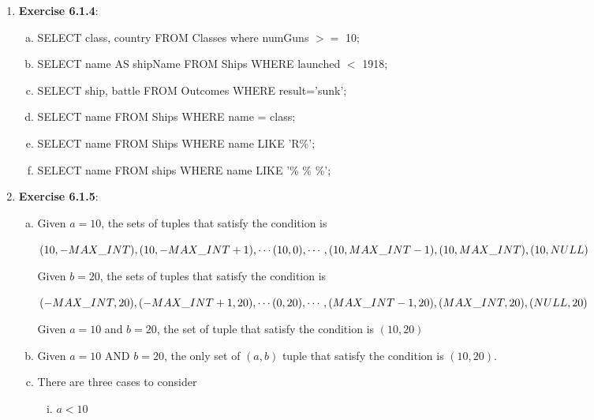 \documentclass[12pt]{article}
\begin{document}
\begin{enumerate}[1.]
    \item \textbf{Exercise 6.1.4}:

    \begin{enumerate}[a)]
        \item SELECT class, country FROM Classes where numGuns $>=$ 10;
        \item SELECT name AS shipName FROM Ships WHERE launched $<$ 1918;
        \item SELECT ship, battle FROM Outcomes WHERE result='sunk';
        \item SELECT name FROM Ships WHERE name = class;
        \item SELECT name FROM Ships WHERE name LIKE 'R\%';
        \item SELECT name FROM ships WHERE name LIKE '\% \% \%';
    \end{enumerate}

    \item \textbf{Exercise 6.1.5}:
    \begin{enumerate}[a)]
        \item Given $a = 10$, the sets of tuples that satisfy the condition is

        \bigskip

        $(10, -MAX\_INT), (10,-MAX\_INT + 1), \cdots (10,0), \cdots, (10,MAX\_INT - 1), \\
        (10,MAX\_INT), (10, NULL)$

        \bigskip

        Given $b = 20$, the sets of tuples that satisfy the condition is

        \bigskip

        $(-MAX\_INT, 20), (-MAX\_INT + 1, 20), \cdots (0, 20), \cdots, (MAX\_INT - 1, 20), \\
        (MAX\_INT, 20), (NULL, 20)$

        \bigskip

        Given $a = 10$ and $b = 20$, the set of tuple that satisfy the condition
        is $(10, 20)$

        \item

        Given $a = 10$ AND $b = 20$, the only set of $(a,b)$ tuple that satisfy the
        condition is $(10, 20)$.

        \item

        There are three cases to consider

        \begin{enumerate}[i.]
            \item $a < 10$


\end{enumerate}
\end{enumerate}
\end{enumerate}
\end{document}
